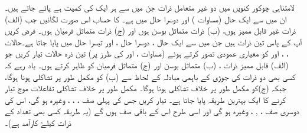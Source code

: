 لامتناہی چوکور کنویں  میں دو  غیر متعامل ذرات جن میں سے ہر ایک کی کمیت   ہے پائے جاتے ہیں۔ ان میں سے ایک حال   (مساوات )   اور دوسرا حال     میں ہے۔  کا حساب اس صورت لگائیں  جب (الف)  ذرات  غیر قابل ممیز ہوں،  (ب) ذرات  متماثل بوسن ہوں اور (ج)  ذرات متماثل فرمیان ہوں۔
فرض کریں آپ کے پاس تین ذرات ہیں جن میں سے ایک حال ،  دوسرا حال ،  اور تیسرا حال  میں پایا  جاتا  ہے۔حالات  ، ،  اور  کو معیاری عمودی تصور کرتے  ہوئے   (مساوات  ،   اور   کی طرز پر)  تین  ذرہ حالات تیار کریں جو (الف) قابل ممیز ذرات ،  (ب) متماثل بوسن اور (ج) متماثل فرمیان کو ظاہر کرتے ہوں۔ یاد رہے کہ کسی بھی دو ذرات کی جوڑی کے باہمی مبادلہ کے لحاظ سے (ب) کو مکمل طور پر تشاکلی ہونا ہوگا،  جبکہ (ج)کو مکمل طور پر خلاف تشاکلی ہونا ہوگا۔   مکمل طور پر خلاف تشاکلی تفاعلات موج تیار کرنے کا ایک بہترین طریقہ پایا جاتا ہے۔   تیار کریں جس کی پہلی صف   ،  ، ،  وغیرہ  ہو گی،  اس کی دوسری صف  ،  , ، وغیرہ ہو گی اور اسی طرح اس کے باقی صف ہوں گے (یہ طریقہ  کسی بھی تعداد کے ذرات کیلۓ کارآمد ہے)۔


